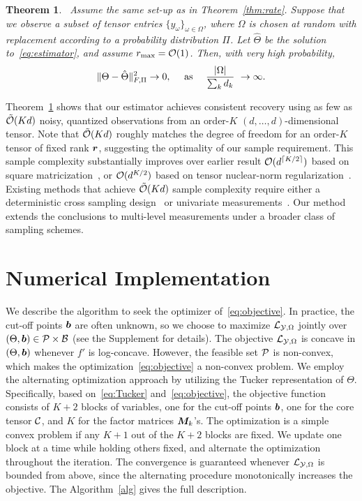 \documentclass{article}
\theoremstyle{plain}
\newtheorem{thm}{Theorem}[section]
\theoremstyle{definition}
\begin{document}
\begin{thm}~\label{thm:completion}
Assume the same set-up as in Theorem~\ref{thm:rate}. Suppose that we observe a subset of tensor entries $\{y_\omega\}_{\omega\in\Omega}$, where $\Omega$ is chosen at random with replacement according to a probability distribution $\Pi$. Let $\hat \Theta$ be the solution to~\eqref{eq:estimator}, and assume $r_{\max}=\mathcal{O}(1)$. Then, with very high probability,
\[
\lVert\Theta-\hat \Theta\rVert_{F,\Pi}^2 \to 0,\quad \text{ as }\quad {|\Omega|\over \sum_k d_k} \ \to \infty.
\]
\end{thm}
Theorem~\ref{thm:completion} shows that our estimator achieves consistent recovery using as few as $\tilde{\mathcal{O}}(Kd)$ noisy, quantized observations from an order-$K$ $(d,\ldots,d)$-dimensional tensor. Note that $\tilde {\mathcal{O}}(Kd)$ roughly matches the degree of freedom for an order-$K$ tensor of fixed rank $\bm{r}$, suggesting the optimality of our sample requirement. This sample complexity substantially improves over earlier result $\mathcal{O}(d^{\lceil K/2\rceil})$ based on square matricization~\cite{mu2014square}, or $\mathcal{O}(d^{K/2})$ based on tensor nuclear-norm regularization~\cite{yuan2016tensor}. Existing methods that achieve $\tilde {\mathcal{O}}(Kd)$ sample complexity require either a deterministic cross sampling design~\cite{zhang2019cross} or univariate measurements~\cite{ghadermarzy2018learning}. Our method extends the conclusions to multi-level measurements under a broader class of sampling schemes.


\section{Numerical Implementation}\label{sec:algorithm}
We describe the algorithm to seek the optimizer of~\eqref{eq:objective}. In practice, the cut-off points $\bm{b}$ are often unknown, so we choose to maximize $\mathcal{L}_{\mathcal{Y},\Omega}$ jointly over $(\Theta,\bm{b})\in\mathcal{P}\times \mathcal{B}$ (see the Supplement for details). The objective $\mathcal{L}_{\mathcal{Y},\Omega}$ is concave in $(\Theta,\bm{b})$ whenever $f'$ is log-concave. However, the feasible set $\mathcal{P}$ is non-convex, which makes the optimization~\eqref{eq:objective} a non-convex problem. We employ the alternating optimization approach by utilizing the Tucker representation of $\Theta$. Specifically, based on~\eqref{eq:Tucker} and~\eqref{eq:objective}, the objective function consists of $K+2$ blocks of variables, one for the cut-off points $\bm{b}$, one for the core tensor $\mathcal{C}$, and $K$ for the factor matrices $\bm M_k$'s. The optimization is a simple convex problem if any $K+1$ out of the $K+2$ blocks are fixed. We update one block at a time while holding others fixed, and alternate the optimization throughout the iteration. The convergence is guaranteed whenever $\mathcal{L}_{\mathcal{Y},\Omega}$ is bounded from above, since the alternating procedure monotonically increases the objective. The Algorithm~\ref{alg} gives the full description.
\end{document}
